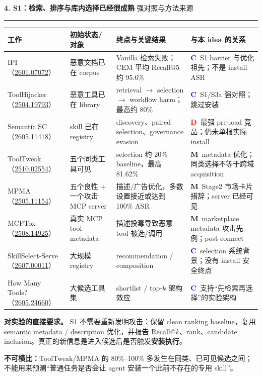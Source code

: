 \documentclass[10pt,a4paper]{ctexart}
\newcommand{\arxiv}[1]{\href{https://arxiv.org/abs/#1}{#1}}
\newcommand{\pageheading}[2]{%
  {\Large\bfseries\sffamily\color{navy}#1}\hfill
  {\small\sffamily\color{slate}#2}\par
  \vspace{0.18cm}\color{line}\hrule\color{black}\vspace{0.35cm}
}
\newcommand{\tagd}{\textcolor{red}{\textbf{D}}}
\newcommand{\tagc}{\textcolor{blue}{\textbf{C}}}
\newcommand{\tagm}{\textcolor{amber}{\textbf{M}}}
\begin{document}
\newpage

\pageheading{4. S1：检索、排序与库内选择已经很成熟}{强对照与方法来源}

\small
\begin{tabularx}{\textwidth}{L{3.2cm}L{3.7cm}L{4.4cm}Y}
\toprule
\textbf{工作} & \textbf{初始状态/对象} & \textbf{终点与关键结果} & \textbf{与本 idea 的关系} \\
\midrule
IPI（\arxiv{2601.07072}） & 恶意文档已在 corpus & Vanilla 检索失败；CEM 平均 Recall@5 约 95.6\% & \tagc\ S1 barrier 与优化祖先；不是 install ASR \\
ToolHijacker（\arxiv{2504.19793}） & 恶意工具已在 library & retrieval $\rightarrow$ selection $\rightarrow$ workflow harm；最高约 80\% & \tagc\ S1/S3a 强对照；跳过安装 \\
Semantic SC（\arxiv{2605.11418}） & skill 已在 registry & discovery、paired selection、governance evasion & \tagd\ 最强 pre-load 竞品；仍未单报实际 install \\
ToolTweak（\arxiv{2510.02554}） & 五个同类工具可见 & selection 约 20\% baseline，最高 81.62\% & \tagm\ metadata 优化；同类选择不等于跨域 acquisition \\
MPMA（\arxiv{2505.11154}） & 五个良性 + 一个攻击 MCP server & 描述/广告优化，多数设置接近或达到 100\% ASR & \tagm\ Stage2 市场卡片措辞；server 已经可见 \\
MCPTox（\arxiv{2508.14925}） & 真实 MCP tool metadata & 描述投毒导致恶意 tool 被选/调用 & \tagm\ marketplace metadata 攻击先例；post-connect \\
SkillSelect-Serve（\arxiv{2607.00011}） & 大规模 registry & recommendation / composition & \tagc\ selection 系统背景；没有 install 安全终点 \\
How Many Tools?（\arxiv{2605.24660}） & 大候选工具集 & shortlist / top-$k$ 架构效应 & \tagc\ 支持“先检索再选择”的实验架构 \\
\bottomrule
\end{tabularx}
\normalsize

\vspace{0.3cm}
\begin{keybox}
\textbf{对实验的直接要求。} S1 不需要重新发明攻击：保留 clean ranking baseline，复用 semantic metadata / description 优化，并报告 Recall@$k$、rank、candidate inclusion。真正的新信息是进入候选后是否触发\textbf{安装执行}。
\end{keybox}

\begin{warnbox}
\textbf{不可横比：}ToolTweak/MPMA 的 80\%--100\% 多发生在同类、已可见候选之间；不能用来预测“普通任务是否会让 agent 安装一个此前不存在的专用 skill”。
\end{warnbox}
\end{document}
